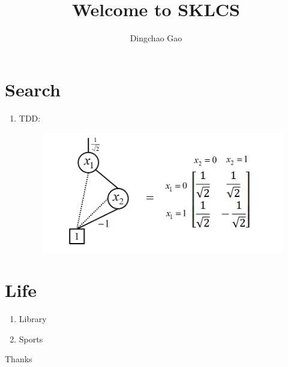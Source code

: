 \documentclass[18 pt]{beamer}
\title{Welcome to SKLCS}
\author[Gcc]{Dingchao Gao}
\begin{document}
\begin{frame}[plain]
  \titlepage
\end{frame}
\section{Search}
\begin{frame}
  \begin{enumerate}
    \item TDD:
    \begin{figure}
      \includegraphics[width = .8\textwidth]{TDD_H_gate2.png}
    \end{figure}
  \end{enumerate}
\end{frame}
\section{Life}
\begin{frame}
\end{frame}
\begin{frame}
  \begin{enumerate}
    \item Library
    \item Sports
  \end{enumerate}
\end{frame}
\begin{frame}
  \centering
  \Huge{Thanks}
\end{frame}
\end{document}
